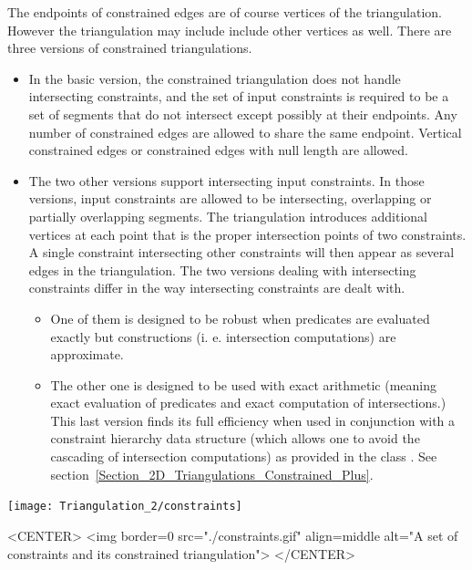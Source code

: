 The endpoints of constrained edges are of course vertices of the
triangulation. However the triangulation may include
include other vertices as well.
There are three versions of  constrained triangulations.
\begin{itemize}
\item
In the basic version, the constrained triangulation 
does not handle intersecting constraints, and the set of input 
constraints is required to be a set of segments that do not intersect
except possibly at their endpoints. Any number of constrained edges
are allowed to share the same endpoint.  Vertical constrained edges or
constrained edges with null length are allowed.
\item 
The two other versions support intersecting input constraints.
In those versions, input constraints are allowed to be
intersecting, overlapping or partially
overlapping segments.
The triangulation introduces  additional  vertices at each point that
is the proper intersection points of  two 
constraints. A single constraint intersecting other
constraints will then appear as several edges in the triangulation.
The two versions dealing with intersecting constraints differ
in the way intersecting constraints are dealt with.
\begin{itemize}
\item
 One of them is
designed to be robust when predicates are evaluated exactly but
constructions (i. e.  intersection computations) are
approximate.
\item
The other one is designed to be used 
with exact arithmetic (meaning exact
evaluation of predicates and exact computation of intersections.)
This last version finds its full efficiency  when used in conjunction
with a constraint hierarchy data structure (which allows one to avoid the
cascading of intersection computations)
as provided in the class
. See
section~\ref{Section_2D_Triangulations_Constrained_Plus}.
\end{itemize}
\end{itemize}


\begin{ccTexOnly}
\begin{center} \texttt{[image: Triangulation\_2/constraints]} \end{center}
\end{ccTexOnly}
 
\begin{ccHtmlOnly}
<CENTER>
<img border=0 src="./constraints.gif" align=middle alt="A set of
constraints and its constrained triangulation">
</CENTER>
\end{ccHtmlOnly}


